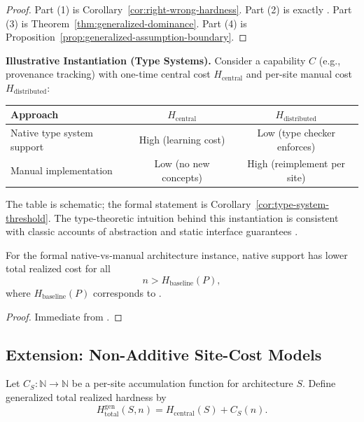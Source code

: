 \begin{proof}
Part (1) is Corollary~\ref{cor:right-wrong-hardness}. Part (2) is exactly . Part (3) is Theorem~\ref{thm:generalized-dominance}. Part (4) is Proposition~\ref{prop:generalized-assumption-boundary}.
\end{proof}

\textbf{Illustrative Instantiation (Type Systems).} Consider a capability $C$ (e.g., provenance tracking) with one-time central cost $H_{\text{central}}$ and per-site manual cost $H_{\text{distributed}}$:

\begin{center}
\begin{tabular}{lcc}
\toprule
\textbf{Approach} & $H_{\text{central}}$ & $H_{\text{distributed}}$ \\
\midrule
Native type system support & High (learning cost) & Low (type checker enforces) \\
Manual implementation & Low (no new concepts) & High (reimplement per site) \\
\bottomrule
\end{tabular}
\end{center}
The table is schematic; the formal statement is Corollary~\ref{cor:type-system-threshold}. The type-theoretic intuition behind this instantiation is consistent with classic accounts of abstraction and static interface guarantees \cite{Cardelli1985, reynolds1983types, pierce2002types, liskov1994behavioral, siek2006gradual, gamma1994design}.

\begin{corollary}\label{cor:type-system-threshold}
For the formal native-vs-manual architecture instance, native support has lower total realized cost for all
\[
n > H_{\mathrm{baseline}}(P),
\]
where $H_{\mathrm{baseline}}(P)$ corresponds to .
\end{corollary}

\begin{proof}
Immediate from .
\end{proof}

\subsection{Extension: Non-Additive Site-Cost Models}\label{sec:nonadditive-site-costs}

\begin{definition}\label{def:generalized-site-accumulation}
Let $C_S : \mathbb{N} \to \mathbb{N}$ be a per-site accumulation function for architecture $S$. Define generalized total realized hardness by
\[
H_{\text{total}}^{\mathrm{gen}}(S,n) = H_{\text{central}}(S) + C_S(n).
\]
\end{definition}

